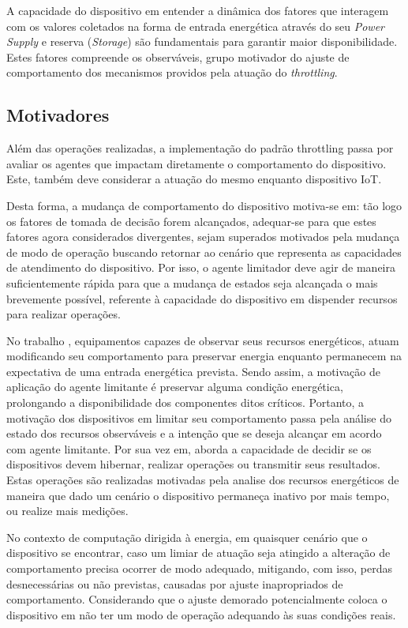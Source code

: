 A capacidade do dispositivo em entender a dinâmica dos fatores que interagem com os valores coletados na forma de entrada energética através do seu \textit{Power Supply} e reserva (\textit{Storage}) são fundamentais para garantir maior disponibilidade. Estes fatores compreende os observáveis, grupo motivador do ajuste de comportamento dos mecanismos providos pela atuação do \textit{throttling}. 


\subsection{Motivadores}

Além das operações realizadas, a implementação do padrão throttling passa por avaliar os agentes que impactam diretamente o comportamento do dispositivo. Este, também deve considerar a atuação do mesmo enquanto dispositivo \acs{IoT}. 

Desta forma, a mudança de comportamento do dispositivo motiva-se em: tão logo os fatores de tomada de decisão forem alcançados, adequar-se para que estes fatores agora considerados divergentes, sejam superados motivados pela mudança de modo de operação buscando retornar ao cenário que representa as capacidades de atendimento do dispositivo.   Por isso, o agente limitador deve agir de maneira suficientemente rápida para que a mudança de estados seja alcançada o mais brevemente possível, referente à capacidade do dispositivo em dispender recursos para realizar operações. 

No trabalho \cite{zhang_toward_2018}, equipamentos capazes de observar seus recursos energéticos, atuam modificando seu comportamento para preservar energia enquanto permanecem na expectativa de uma entrada energética prevista. Sendo assim, a motivação de aplicação do agente limitante é preservar alguma condição energética, prolongando a disponibilidade dos componentes ditos críticos. Portanto, a motivação dos dispositivos em limitar seu comportamento passa pela análise do estado dos recursos observáveis e a intenção que se deseja alcançar em acordo com agente limitante. Por sua vez em, \cite{gong_sleep_2022} aborda a capacidade de decidir se os dispositivos devem hibernar, realizar operações ou transmitir seus resultados. Estas operações são realizadas motivadas pela analise dos recursos energéticos de maneira que dado um cenário o dispositivo permaneça inativo por mais tempo, ou realize mais medições.

No contexto de computação dirigida à energia, em quaisquer cenário que o dispositivo se encontrar, caso um limiar de atuação seja atingido a alteração de comportamento precisa ocorrer de modo adequado, mitigando, com isso, perdas desnecessárias ou não previstas, causadas por ajuste inapropriados de comportamento. Considerando que o ajuste demorado potencialmente coloca o dispositivo em não ter um modo de operação adequando às suas condições reais.

